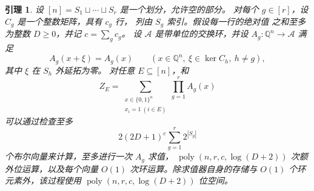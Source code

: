 \documentclass[11pt,reqno]{amsart}
\numberwithin{equation}{section}
\newtheorem{lemma}[theorem]{引理}
\theoremstyle{definition}\newtheorem{definition}[theorem]{定义}
\theoremstyle{remark}\newtheorem{remark}[theorem]{注}
\newcommand{\poly}{\operatorname{poly}}
\renewcommand{\ge}{\geqslant}
\begin{document}
\begin{lemma}\label{lem:measurement-separation}
设 $[n]=S_1\sqcup\cdots\sqcup S_r$ 是一个划分，允许空的部分。
对每个 $g\in[r]$，设 $C_g$ 是一个整数矩阵，具有 $c_g$ 行，
列由 $S_g$ 索引。假设每一行的绝对值
之和至多为整数 $D\ge0$，并记 $c=\sum_g c_g$。
设 $\mathcal A$ 是带单位的交换环，并设
$A_g:\mathbb Q^n\to\mathcal A$ 满足
\[
 A_g(x+\xi)=A_g(x)
 \qquad
 (x\in\mathbb Q^n,\ \xi\in\ker C_h,\ h\ne g),
\]
其中 $\xi$ 在 $S_h$ 外延拓为零。
对任意 $E\subseteq[n]$，和
\[
 Z_E=\sum_{\substack{x\in\{0,1\}^n\\x_i=1\ (i\in E)}}
           \prod_{g=1}^r A_g(x)
\]
可以通过检查至多
\[
 2(2D+1)^c\sum_{g=1}^r2^{|S_g|}
\]
个布尔向量来计算，至多进行一次 $A_g$ 求值，
$\poly(n,r,c,\log(D+2))$ 次额外位运算，以及每个向量 $O(1)$ 次环运算。除求值器自身的存储与
$O(1)$ 个环元素外，该过程使用 $\poly(n,r,c,\log(D+2))$
位空间。
\end{lemma}
\end{document}
